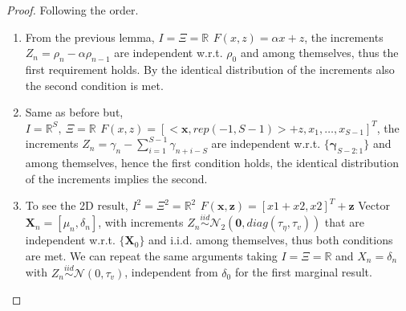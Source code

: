 \documentclass[11pt,twoside]{report}
\begin{document}
\begin{proof}
	Following the order.
	\begin{enumerate}
		\item From the previous lemma, $ I=\Xi= \mathbb{R}\,\ F(x,z) = \alpha x + z $, the increments $ Z_n = \rho_n-\alpha\rho_{n-1} $ are independent w.r.t. $ \rho_0 $ and among themselves, thus the first requirement holds. By the identical distribution of the increments also the second condition is met.
		\item Same as before but, $ I=\mathbb{R}^S,\ \Xi= \mathbb{R}\,\ F(x,z) = [<\mathbf{x}, rep(-1,S-1)> + z, x_1, \dots, x_{S-1}]^T $, the increments $ Z_n = \gamma_n-\sum_{i=1}^{S-1}\gamma_{n+i-S} $ are independent w.r.t. $ \{\boldsymbol{\gamma}_{S-2:1}\} $ and among themselves, hence the first condition holds, the identical distribution of the increments implies the second.
		\item To see the 2D result, $ I^2=\Xi^2= \mathbb{R}^2\,\ F(\mathbf{x},\mathbf{z}) = [x1+x2,x2]^T + \mathbf{z}$  Vector $ \mathbf{X}_n = [\mu_n, \delta_n] $, with increments $ Z_n \overset{iid}{\sim} \mathcal{N}_2(\mathbf{0}, diag(\tau_\eta, \tau_v)) $ that are independent w.r.t. $ \{\mathbf{X}_0\} $ and i.i.d. among themselves, thus both conditions are met. We can repeat the same arguments taking $ I=\Xi= \mathbb{R}$ and $ X_n=\delta_n $ with $ Z_n \overset{iid}{\sim} \mathcal{N}(0,\tau_v) $, independent from $ \delta_0 $ for the first marginal result.
	

\end{enumerate}
\end{proof}
\end{document}

